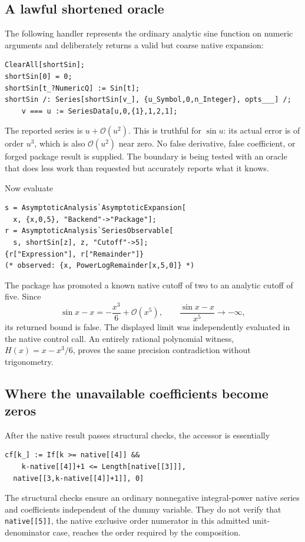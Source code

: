 \documentclass[11pt,letterpaper]{article}
\newcommand{\code}[1]{\nolinkurl{#1}}
\newcommand{\OO}{\mathcal{O}}
\begin{document}
\subsection{A lawful shortened oracle}
The following handler represents the ordinary analytic sine function on numeric
arguments and deliberately returns a valid but coarse native expansion:
\begin{lstlisting}
ClearAll[shortSin];
shortSin[0] = 0;
shortSin[t_?NumericQ] := Sin[t];
shortSin /: Series[shortSin[v_], {u_Symbol,0,n_Integer}, opts___] /;
    v === u := SeriesData[u,0,{1},1,2,1];
\end{lstlisting}
The reported series is $u+\OO(u^2)$. This is truthful for $\sin u$: its actual
error is of order $u^3$, which is also $\OO(u^2)$ near zero. No false derivative,
false coefficient, or forged package result is supplied. The boundary is being
tested with an oracle that does less work than requested but accurately reports
what it knows.

Now evaluate
\begin{lstlisting}
s = AsymptoticAnalysis`AsymptoticExpansion[
  x, {x,0,5}, "Backend"->"Package"];
r = AsymptoticAnalysis`SeriesObservable[
  s, shortSin[z], z, "Cutoff"->5];
{r["Expression"], r["Remainder"]}
(* observed: {x, PowerLogRemainder[x,5,0]} *)
\end{lstlisting}
The package has promoted a known native cutoff of two to an analytic cutoff of
five. Since
\begin{equation}
 \sin x-x=-\frac{x^3}{6}+\OO(x^5),
 \qquad \frac{\sin x-x}{x^5}\longrightarrow-\infty,
\end{equation}
its returned bound is false. The displayed limit was independently evaluated
in the native control call. An entirely rational polynomial witness,
$H(x)=x-x^3/6$, proves the same precision contradiction without trigonometry.

\subsection{Where the unavailable coefficients become zeros}
After the native result passes structural checks, the accessor is essentially
\begin{lstlisting}
cf[k_] := If[k >= native[[4]] &&
    k-native[[4]]+1 <= Length[native[[3]]],
  native[[3,k-native[[4]]+1]], 0]
\end{lstlisting}
The structural checks ensure an ordinary nonnegative integral-power native
series and coefficients independent of the dummy variable. They do not verify
that \code{native[[5]]}, the native exclusive order numerator in this admitted
unit-denominator case, reaches the order required by the composition.
\cite{operations,wl-seriesdata}
\end{document}
